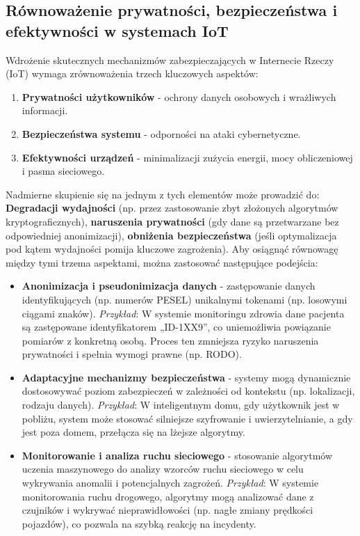 \subsection{Równoważenie prywatności, bezpieczeństwa i efektywności w systemach IoT}
Wdrożenie skutecznych mechanizmów zabezpieczających w Internecie Rzeczy (IoT) wymaga zrównoważenia trzech kluczowych aspektów:
\begin{enumerate}
    \item \textbf{Prywatności użytkowników} - ochrony danych osobowych i wrażliwych informacji.
    \item \textbf{Bezpieczeństwa systemu} - odporności na ataki cybernetyczne.
    \item \textbf{Efektywności urządzeń} - minimalizacji zużycia energii, mocy obliczeniowej i pasma sieciowego.
\end{enumerate}
Nadmierne skupienie się na jednym z tych elementów może prowadzić do:
\textbf{Degradacji wydajności} (np. przez zastosowanie zbyt złożonych algorytmów kryptograficznych), \textbf{naruszenia prywatności} (gdy dane są przetwarzane bez odpowiedniej anonimizacji), \textbf{obniżenia bezpieczeństwa} (jeśli optymalizacja pod kątem wydajności pomija kluczowe zagrożenia).
Aby osiągnąć równowagę między tymi trzema aspektami, można zastosować następujące podejścia: 
\begin{itemize}
    \item \textbf{Anonimizacja i pseudonimizacja danych} - zastępowanie danych identyfikujących (np. numerów PESEL) unikalnymi tokenami (np. losowymi ciągami znaków). \textit{Przykład}: W systemie monitoringu zdrowia dane pacjenta są zastępowane identyfikatorem „ID-1XX9”, co uniemożliwia powiązanie pomiarów z konkretną osobą. Proces ten zmniejsza ryzyko naruszenia prywatności i spełnia wymogi prawne (np. RODO).
    \item \textbf{Adaptacyjne mechanizmy bezpieczeństwa} - systemy mogą dynamicznie dostosowywać poziom zabezpieczeń w zależności od kontekstu (np. lokalizacji, rodzaju danych). \textit{Przykład}: W inteligentnym domu, gdy użytkownik jest w pobliżu, system może stosować silniejsze szyfrowanie i uwierzytelnianie, a gdy jest poza domem, przełącza się na lżejsze algorytmy.
    \item \textbf{Monitorowanie i analiza ruchu sieciowego} - stosowanie algorytmów uczenia maszynowego do analizy wzorców ruchu sieciowego w celu wykrywania anomalii i potencjalnych zagrożeń. \textit{Przykład}: W systemie monitorowania ruchu drogowego, algorytmy mogą analizować dane z czujników i wykrywać nieprawidłowości (np. nagłe zmiany prędkości pojazdów), co pozwala na szybką reakcję na incydenty.
\end{itemize}

